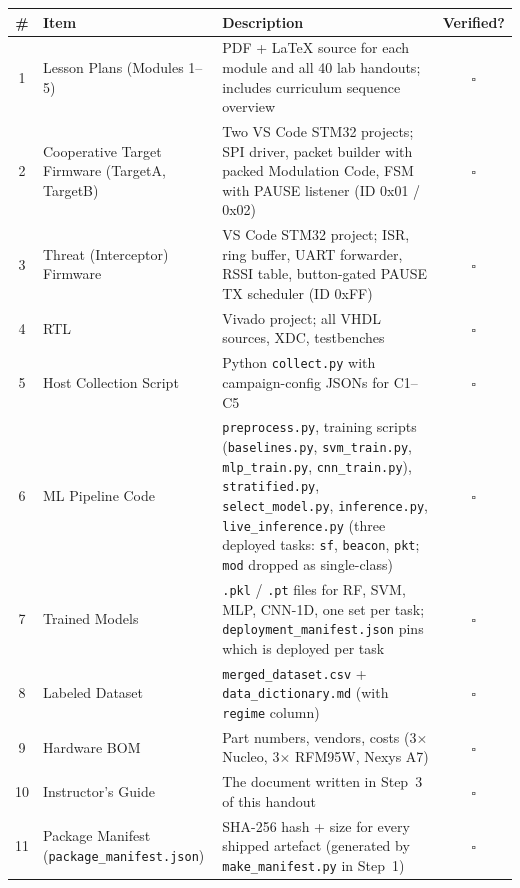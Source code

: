 \documentclass[11pt,letterpaper]{article}
\begin{document}
\begin{table}[h!]
	\centering
	\renewcommand{\arraystretch}{1.3}
	\begin{tabularx}{\textwidth}{c l X c}
		\toprule
		\textbf{\#} & \textbf{Item} & \textbf{Description} & \textbf{Verified?} \\
		\midrule
		1  & Lesson Plans (Modules 1--5)               & PDF + LaTeX source for each module and all 40 lab handouts; includes curriculum sequence overview & $\square$ \\
		2  & Cooperative Target Firmware (TargetA, TargetB) & Two VS Code STM32 projects; SPI driver, packet builder with packed Modulation Code, FSM with PAUSE listener (ID 0x01 / 0x02) & $\square$ \\
		3  & Threat (Interceptor) Firmware             & VS Code STM32 project; ISR, ring buffer, UART forwarder, RSSI table, button-gated PAUSE TX scheduler (ID 0xFF) & $\square$ \\
		4  & \FPGA{} \mbox{RTL{}}                      & Vivado project; all \mbox{VHDL} sources, XDC, testbenches & $\square$ \\
		5  & Host Collection Script                    & Python \texttt{collect.py} with campaign-config \mbox{JSON}s for C1--C5 & $\square$ \\
		6  & ML Pipeline Code                          & \texttt{preprocess.py}, training scripts (\texttt{baselines.py}, \texttt{svm\_train.py}, \texttt{mlp\_train.py}, \texttt{cnn\_train.py}), \texttt{stratified.py}, \texttt{select\_model.py}, \texttt{inference.py}, \texttt{live\_inference.py} (three deployed tasks: \texttt{sf}, \texttt{beacon}, \texttt{pkt}; \texttt{mod} dropped as single-class) & $\square$ \\
		7  & Trained Models                            & \texttt{.pkl} / \texttt{.pt} files for RF, SVM, MLP, CNN-1D, one set per task; \texttt{deployment\_manifest.json} pins which is deployed per task & $\square$ \\
		8  & Labeled Dataset                           & \texttt{merged\_dataset.csv} + \texttt{data\_dictionary.md} (with \texttt{regime} column) & $\square$ \\
		9  & Hardware \mbox{BOM}                       & Part numbers, vendors, costs (3$\times$ Nucleo, 3$\times$ RFM95W, Nexys A7) & $\square$ \\
		10 & Instructor's Guide                        & The document written in Step~3 of this handout & $\square$ \\
		11 & Package Manifest (\texttt{package\_manifest.json}) & SHA-256 hash + size for every shipped artefact (generated by \texttt{make\_manifest.py} in Step~1) & $\square$ \\
		\bottomrule
	\end{tabularx}
\end{table}
\end{document}
